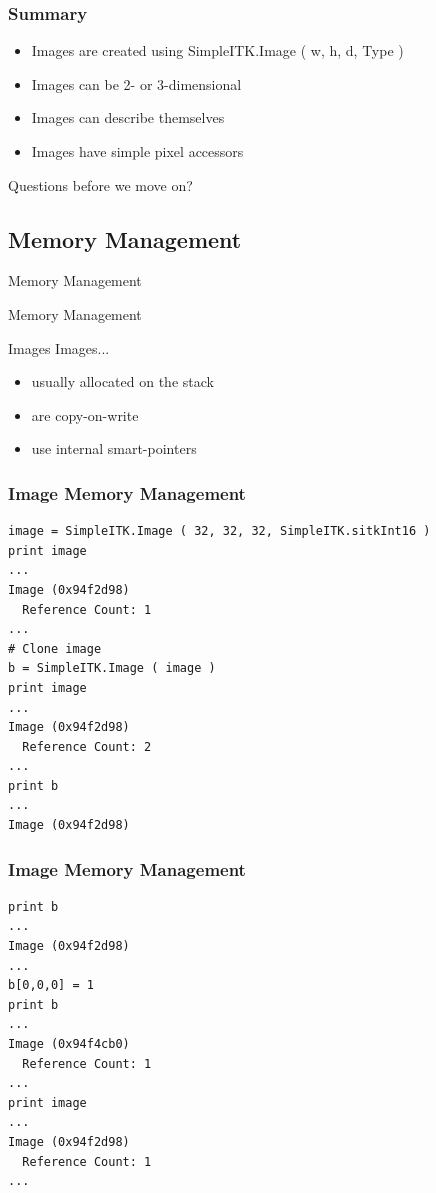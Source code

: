 \begin{frame}[fragile]
\frametitle{Summary}
\begin{itemize}
  \item Images are created using SimpleITK.Image ( w, h, d, Type )
  \item Images can be 2- or 3-dimensional
  \item Images can describe themselves
  \item Images have simple pixel accessors
\end{itemize}
Questions before we move on?
\end{frame}

\subsection{Memory Management}

\begin{frame}{Memory Management}
\fontsize{36pt}{36pt}\selectfont
\center
\begin{center}
Memory Management
\end{center}
\end{frame}


\begin{frame}{Images}
Images...
\begin{itemize}
  \item usually allocated on the stack
  \item are copy-on-write
  \item use internal smart-pointers
\end{itemize}
\end{frame}

\begin{frame}[fragile]
\frametitle{Image Memory Management}
\lstpython
\begin{lstlisting}
image = SimpleITK.Image ( 32, 32, 32, SimpleITK.sitkInt16 )
print image
...
Image (0x94f2d98)
  Reference Count: 1
...
# Clone image
b = SimpleITK.Image ( image )
print image
...
Image (0x94f2d98)
  Reference Count: 2
...
print b
...
Image (0x94f2d98)
\end{lstlisting}
\end{frame}

\begin{frame}[fragile]
\frametitle{Image Memory Management}
\lstpython
\begin{lstlisting}
print b
...
Image (0x94f2d98)
...
b[0,0,0] = 1
print b
...
Image (0x94f4cb0)
  Reference Count: 1
...
print image
...
Image (0x94f2d98)
  Reference Count: 1
...
\end{lstlisting}
\end{frame}


